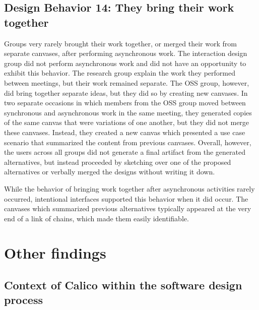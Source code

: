 \subsection{Design Behavior 14: They bring their work together}

Groups very rarely brought their work together, or merged their work from separate canvases, after performing asynchronous work. The interaction design group did not perform asynchronous work and did not have an opportunity to exhibit this behavior. The research group explain the work they performed between meetings, but their work remained separate. The OSS group, however, did bring together separate ideas, but they did so by creating new canvases. In two separate occasions in which members from the OSS group moved between synchronous and asynchronous work in the same meeting, they generated copies of the same canvas that were variations of one another, but they did not merge these canvases. Instead, they created a new canvas which presented a use case scenario that summarized the content from previous canvases. Overall, however, the users across all groups did not generate a final artifact from the generated alternatives, but instead proceeded by sketching over one of the proposed alternatives or verbally merged the designs without writing it down.

While the behavior of bringing work together after asynchronous activities rarely occurred, intentional interfaces supported this behavior when it did occur. The canvases which summarized previous alternatives typically appeared at the very end of a link of chains, which made them easily identifiable.


\section{Other findings}

\subsection{Context of Calico within the software design process}

